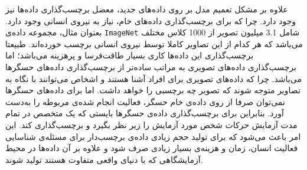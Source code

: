 علاوه بر مشکل تعمیم مدل بر روی داده‌های جدید، معضل برچسب‌گذاری داده‌ها نیز وجود دارد. چرا که برای برچسب‌گذاری داده‌های خام، نیاز به نیروی انسانی وجود دارد. بعنوان مثال، مجموعه داده‌ی
\verb|ImageNet|
شامل 3.1 میلیون تصویر از 1000 کلاس مختلف می‌باشد که هر کدام از این تصاویر کاملا توسط نیروی انسانی برچسب خورده‌اند\cite{deng2009imagenet}.
طبیعتا برچسب‌گذاری این داده‌ها کاری بسیار طاقت‌فرسا و پرهزینه می‌باشد؛ اما برچسب‌گذاری داده‌های تصویری به مراتب ساده‌تر از برچسب‌گذاری داده‌های حسگرها می‌باشد. چرا که داده‌های تصویری برای افراد آشنا هستند و اشخاص می‌توانند با نگاه به تصاویر متوجه شوند که تصویر چه برچسبی را خواهد داشت. اما برای داده‌های حسگرها نمی‌توان صرفا از روی داده‌ی خام حسگر، فعالیت انجام شده‌ی مربوطه را به‌دست آورد. بنابراین برای برچسب‌گذاری داده‌ی حسگرها بایستی که یک متخصص در تمام مدت آزمایش حرکات شخص مورد آزمایش را زیر نظر بگیرد و برچسب‌گذاری کند. این امر باعث می‌شود که برای تولید حجم زیادی داده‌ی برچسب‌دار برای مسئله‌ی شناسایی فعالیت انسان، زمان و هزینه‌ی بسیار زیادی صرف شود و علاوه بر آن داده‌ها در محیط آزمایشگاهی که با دنیای واقعی متفاوت هستند تولید شوند.

